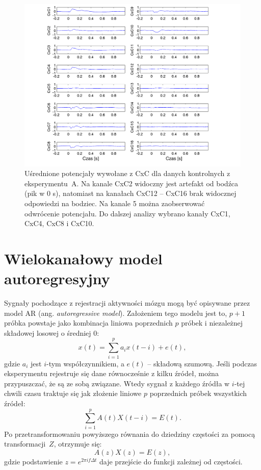 \documentclass{pracamgr_2}
\begin{document}
	\begin{figure}[h]
		\begin{center}
			\includegraphics[width=\columnwidth]{16_kanalow.png}
		\end{center}
		\caption{Uśrednione potencjały wywołane z CxC dla danych kontrolnych z eksperymentu~A. Na kanale CxC2 widoczny jest artefakt od bodźca (pik w 0 s), natomiast na kanałach CxC12 -- CxC16 brak widocznej odpowiedzi na bodziec. Na kanale 5 można zaobserwować odwrócenie potencjału. Do dalszej analizy wybrano kanały CxC1, CxC4, CxC8 i CxC10.}
		\label{rys:16_kanalow}
	\end{figure}
	\newpage
	\section{Wielokanałowy model autoregresyjny}
	Sygnały pochodzące z rejestracji aktywności mózgu mogą być opisywane przez model AR (ang. \textit{autoregressive model}). Założeniem tego modelu jest to, $p + 1$ próbka powstaje jako kombinacja liniowa poprzednich $p$ próbek i niezależnej składowej losowej o średniej 0:
	\begin{equation}
		x(t) =  \sum_{i=1}^{p}a_ix(t-i) + e(t),
	\end{equation}
	gdzie $a_i$ jest $i$-tym współczynnikiem, a $e(t)$ -- składową szumową. \newline
	Jeśli podczas eksperymentu rejestruje się dane równocześnie z kilku źródeł, można przypuszczać, że są ze sobą związane. Wtedy sygnał z każdego źródła w $i$-tej chwili czasu traktuje się jak złożenie liniowe $p$ poprzednich próbek wszystkich źródeł:
	\begin{equation}
		\sum_{i=1}^{p}A(t)X(t-i) = E(t).
	\end{equation}
	Po przetransformowaniu powyższego równania do dziedziny częstości za pomocą transformacji~$Z$, otrzymuje się:
	\begin{equation}
		A(z)X(z) = E(z),
	\end{equation}
	gdzie podstawienie $z = e^{2\pi if\Delta t}$ daje przejście do funkcji zależnej od częstości.
	
\end{document}
